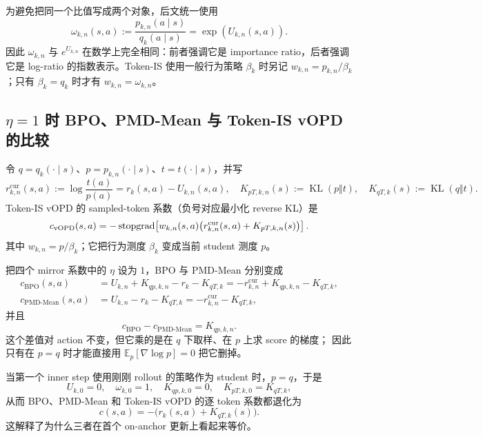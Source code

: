 为避免把同一个比值写成两个对象，后文统一使用
\begin{equation}
\label{eq:ch2-omega-exp-u}
\omega_{k,n}(s,a)
:=\frac{p_{k,n}(a\mid s)}{q_k(a\mid s)}
=\exp\!\left(U_{k,n}(s,a)\right).
\end{equation}
因此 $\omega_{k,n}$ 与 $e^{U_{k,n}}$ 在数学上完全相同：前者强调它是 importance ratio，后者强调它是 log-ratio 的指数表示。Token-IS 使用一般行为策略 $\beta_k$ 时另记 $w_{k,n}=p_{k,n}/\beta_k$；只有 $\beta_k=q_k$ 时才有 $w_{k,n}=\omega_{k,n}$。

\subsection{$\eta=1$ 时 BPO、PMD-Mean 与 Token-IS vOPD 的比较}
\label{subsec:ch2-opd-eta-one-vopd}

令 $q=q_k(\cdot\mid s)$、$p=p_{k,n}(\cdot\mid s)$、$t=t(\cdot\mid s)$，并写
\begin{equation}
r_{k,n}^{\mathrm{cur}}(s,a):=\log\frac{t(a)}{p(a)}=r_k(s,a)-U_{k,n}(s,a),
\quad
K_{pT,k,n}(s):=\operatorname{KL}(p\Vert t),
\quad
K_{qT,k}(s):=\operatorname{KL}(q\Vert t).
\end{equation}
Token-IS vOPD 的 sampled-token 系数（负号对应最小化 reverse KL）是
\begin{equation}
\label{eq:ch2-vopd-token-is-coef}
c_{\mathrm{vOPD}}(s,a)
=-\operatorname{stopgrad}\!\left[
w_{k,n}(s,a)\bigl(r_{k,n}^{\mathrm{cur}}(s,a)+K_{pT,k,n}(s)\bigr)
\right].
\end{equation}
其中 $w_{k,n}=p/\beta_k$；它把行为测度 $\beta_k$ 变成当前 student 测度 $p$。

把四个 mirror 系数中的 $\eta$ 设为 $1$，BPO 与 PMD-Mean 分别变成
\begin{align}
c_{\mathrm{BPO}}(s,a)
&=U_{k,n}+K_{qp,k,n}-r_k-K_{qT,k}
 =-r_{k,n}^{\mathrm{cur}}+K_{qp,k,n}-K_{qT,k},
\label{eq:ch2-bpo-eta-one}\\
c_{\mathrm{PMD\text{-}Mean}}(s,a)
&=U_{k,n}-r_k-K_{qT,k}
 =-r_{k,n}^{\mathrm{cur}}-K_{qT,k},
\label{eq:ch2-pmd-mean-eta-one}
\end{align}
并且
\begin{equation}
c_{\mathrm{BPO}}-c_{\mathrm{PMD\text{-}Mean}}=K_{qp,k,n}.
\end{equation}
这个差值对 action 不变，但它乘的是在 $q$ 下取样、在 $p$ 上求 score 的梯度； 因此只有在 $p=q$ 时才能直接用 $\mathbb E_p[\nabla\log p]=0$ 把它删掉。

当第一个 inner step 使用刚刚 rollout 的策略作为 student 时，$p=q$，于是
\begin{equation}
U_{k,0}=0,\quad \omega_{k,0}=1,\quad
K_{qp,k,0}=0,\quad K_{pT,k,0}=K_{qT,k},
\end{equation}
从而 BPO、PMD-Mean 和 Token-IS vOPD 的逐 token 系数都退化为
\begin{equation}
c(s,a)=-\bigl(r_k(s,a)+K_{qT,k}(s)\bigr).
\end{equation}
这解释了为什么三者在首个 on-anchor 更新上看起来等价。

